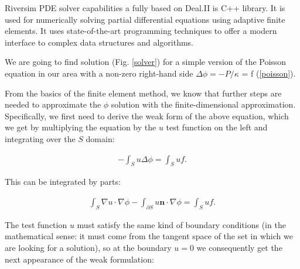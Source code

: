 \documentclass[]{pracamgr}
\begin{document}
      Riversim PDE solver capabilities a fully based on Deal.II\cite{dealII94} is C++ library. It is used for numerically solving partial differential equations using adaptive finite elements. It uses state-of-the-art programming techniques to offer a modern interface to complex data structures and algorithms.

      We are going to find solution (Fig. \ref{solver}) for a simple version of the Poisson equation in our area with a non-zero right-hand side $\Delta \phi = -P/\kappa$ = f (\ref{poisson}).

      From the basics of the finite element method, we know that further steps are needed to approximate the $\phi$ solution with the finite-dimensional approximation. Specifically, we first need to derive the weak form of the above equation, which we get by multiplying the equation by the $u$ test function on the left and integrating over the $S$ domain:
      
      \begin{align*}
        -\int_S u \Delta \phi = \int_S u f.
      \end{align*}
      
      This can be integrated by parts:
      
      \begin{align*}
        \int_S \nabla u \cdot \nabla \phi
        -
        \int_{\partial S} u \mathbf{n}\cdot \nabla \phi
         = \int_S u f.
      \end{align*}
      
      The test function $u$ must satisfy the same kind of boundary conditions (in the mathematical sense: it must come from the tangent space of the set in which we are looking for a solution), so at the boundary $u=0$ we consequently get the next appearance of the weak formulation:
      
\end{document}
